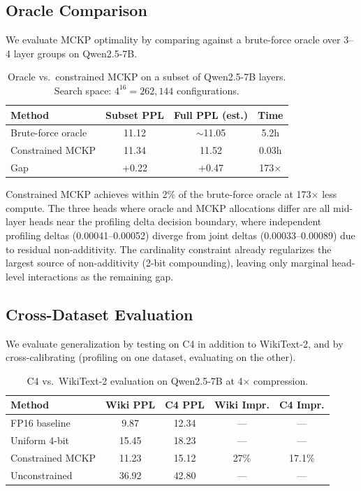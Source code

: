 \documentclass[11pt,a4paper]{article}
\begin{document}
\subsection{Oracle Comparison}
\label{sec:oracle}

We evaluate MCKP optimality by comparing against a brute-force oracle over 3--4 layer groups on Qwen2.5-7B.

\begin{table}[t]
\centering
\small
\caption{Oracle vs.\ constrained MCKP on a subset of Qwen2.5-7B layers. Search space: $4^{16} = 262{,}144$ configurations.}
\label{tab:oracle}
\begin{tabular}{lccc}
\toprule
\textbf{Method} & \textbf{Subset PPL} & \textbf{Full PPL (est.)} & \textbf{Time} \\
\midrule
Brute-force oracle & 11.12 & $\sim$11.05 & 5.2h \\
Constrained MCKP   & 11.34 & 11.52 & 0.03h \\
\midrule
Gap & +0.22 & +0.47 & 173$\times$ \\
\bottomrule
\end{tabular}
\end{table}

Constrained MCKP achieves within 2\% of the brute-force oracle at 173$\times$ less compute.
The three heads where oracle and MCKP allocations differ are all mid-layer heads near the profiling delta decision boundary, where independent profiling deltas (0.00041--0.00052) diverge from joint deltas (0.00033--0.00089) due to residual non-additivity.
The cardinality constraint already regularizes the largest source of non-additivity (2-bit compounding), leaving only marginal head-level interactions as the remaining gap.

\subsection{Cross-Dataset Evaluation}
\label{sec:cross_dataset}

We evaluate generalization by testing on C4 in addition to WikiText-2, and by cross-calibrating (profiling on one dataset, evaluating on the other).

\begin{table}[t]
\centering
\small
\caption{C4 vs.\ WikiText-2 evaluation on Qwen2.5-7B at 4$\times$ compression.}
\label{tab:c4}
\begin{tabular}{lcccc}
\toprule
\textbf{Method} & \textbf{Wiki PPL} & \textbf{C4 PPL} & \textbf{Wiki Impr.} & \textbf{C4 Impr.} \\
\midrule
FP16 baseline     &  9.87 & 12.34 & --- & --- \\
Uniform 4-bit     & 15.45 & 18.23 & --- & --- \\
Constrained MCKP  & 11.23 & 15.12 & 27\% & 17.1\% \\
Unconstrained     & 36.92 & 42.80 & --- & --- \\
\bottomrule
\end{tabular}
\end{table}
\end{document}
